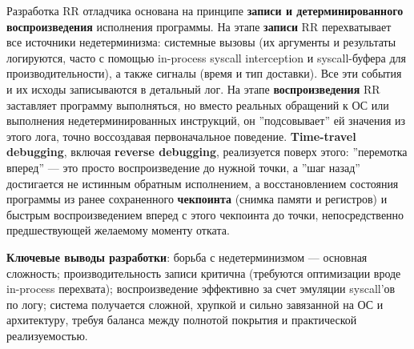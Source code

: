 
Разработка RR отладчика основана на принципе \textbf{записи и
детерминированного воспроизведения} исполнения программы. На этапе
\textbf{записи} RR перехватывает все источники недетерминизма: системные вызовы
(их аргументы и результаты логируются, часто с помощью in-process syscall
interception и syscall-буфера для производительности), а также сигналы (время и
тип доставки). Все эти события и их исходы записываются в детальный лог. На
этапе \textbf{воспроизведения} RR заставляет программу выполняться, но вместо
реальных обращений к ОС или выполнения недетерминированных инструкций, он
''подсовывает'' ей значения из этого лога, точно воссоздавая первоначальное
поведение. \textbf{Time-travel debugging}, включая \textbf{reverse debugging},
реализуется поверх этого: ''перемотка вперед'' — это просто воспроизведение до
нужной точки, а ''шаг назад'' достигается не истинным обратным исполнением, а
восстановлением состояния программы из ранее сохраненного \textbf{чекпоинта}
(снимка памяти и регистров) и быстрым воспроизведением вперед с этого чекпоинта
до точки, непосредственно предшествующей желаемому моменту отката.

\textbf{Ключевые выводы разработки}: борьба с недетерминизмом — основная сложность;
производительность записи критична (требуются оптимизации вроде in-process
перехвата); воспроизведение эффективно за счет эмуляции syscall'ов по логу;
система получается сложной, хрупкой и сильно завязанной на ОС и архитектуру,
требуя баланса между полнотой покрытия и практической реализуемостью.